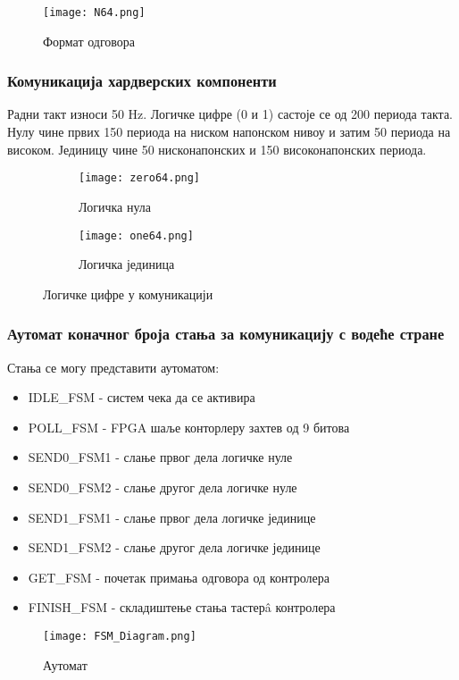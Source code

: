 \documentclass{article}
\begin{document}
	\begin{figure}[h]
	    \centering
	    \texttt{[image: N64.png]}
	    \caption{Формат одговора}
	    \label{fig:your_label}
	\end{figure}
\newpage
\subsubsection{Комуникација хардверских компоненти}
Радни такт износи 50 Hz. Логичке цифре (0 и 1) састоје се од 200 периода такта. Нулу чине првих 150 периода на ниском напонском нивоу и затим 50 периода на високом. Јединицу чине 50 нисконапонских и 150 високонапонских периода.
\begin{figure}[h]
    \centering
    \begin{subfigure}[b]{0.4\textwidth}
        \centering
        \texttt{[image: zero64.png]}
        \caption{Логичка нула}
        \label{fig:subfig1}
    \end{subfigure}
    \hfill
    \begin{subfigure}[b]{0.4\textwidth}
        \centering
        \texttt{[image: one64.png]}
        \caption{Логичка јединица}
        \label{fig:subfig2}
    \end{subfigure}
    \caption{Логичке цифре у комуникацији}
    \label{fig:fig}
\end{figure}\par

\subsubsection{Аутомат коначног броја стања за комуникацију с водеће стране}
Стања се могу представити аутоматом:
\begin{itemize}
	\item IDLE\_FSM - систем чека да се активира
	\item POLL\_FSM - FPGA шаље конторлеру захтев од 9 битова
	\item SEND0\_FSM1 - слање првог дела логичке нуле
	\item SEND0\_FSM2 - слање другог дела логичке нуле
	\item SEND1\_FSM1 - слање првог дела логичке јединице
	\item SEND1\_FSM2 - слање другог дела логичке јединице
	\item GET\_FSM - почетак примања одговора од контролера
	\item FINISH\_FSM - складиштење стања тастерâ контролера
\end{itemize}
\newpage
\begin{figure}[h]
    \centering
    \texttt{[image: FSM\_Diagram.png]}
    \caption{Аутомат}
    \label{fig:your_label}
\end{figure}
\end{document}
